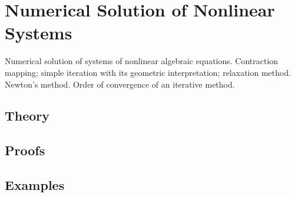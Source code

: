
\section{Numerical Solution of Nonlinear Systems}
\label{sec:2.1.08-nonlinear-systems}

\begin{ticket}
Numerical solution of systems of nonlinear algebraic equations. Contraction mapping; simple iteration with its geometric interpretation; relaxation method. Newton's method. Order of convergence of an iterative method.
\end{ticket}

\subsection*{Theory}

\subsection*{Proofs}

\subsection*{Examples}
